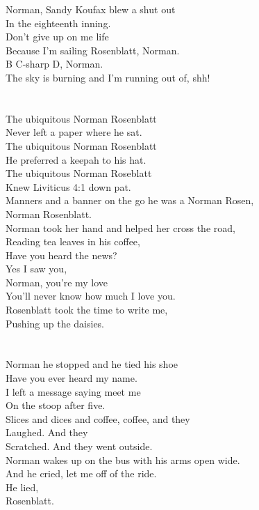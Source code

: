 \documentclass[a4paper]{book}
\begin{document}
Norman, Sandy Koufax blew a shut out\\
In the eighteenth inning.\\
Don't give up on me life\\
Because I'm sailing Rosenblatt, Norman.\\
B C-sharp D, Norman.\\
The sky is burning and I'm running out of, shh!\\
\\\hfill\\
The ubiquitous Norman Rosenblatt\\
Never left a paper where he sat.\\
The ubiquitous Norman Rosenblatt\\
He preferred a keepah to his hat.\\
The ubiquitous Norman Roseblatt\\
Knew Liviticus 4:1 down pat.\\
Manners and a banner on the go he was a Norman Rosen,\\
Norman Rosenblatt.\\
Norman took her hand and helped her cross the road,\\
Reading tea leaves in his coffee,\\
Have you heard the news?\\
Yes I saw you,\\
Norman, you're my love\\
You'll never know how much I love you.\\
Rosenblatt took the time to write me,\\
Pushing up the daisies.\\
\\\hfill\\
Norman he stopped and he tied his shoe\\
Have you ever heard my name.\\
I left a message saying meet me\\
On the stoop after five.\\
Slices and dices and coffee, coffee, and they\\
Laughed.
And they\\
Scratched.
And they went outside.\\
Norman wakes up on the bus with his arms open wide.\\
And he cried, let me off of the ride.\\
He lied,\\
Rosenblatt.\\
\end{document}

